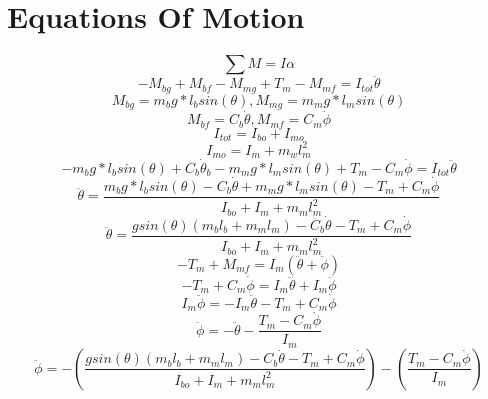 \documentclass[12pt]{article}
\begin{document}
	\section{Equations Of Motion}
		\begin{equation}
			\sum M = I\alpha
		\end{equation}
		\begin{equation}
			-M_{bg}+M_{bf}-M_{mg}+T_m-M_{mf} = I_{tot}\ddot\theta
		\end{equation}
		\begin{equation}
			M_{bg} = m_b g*l_b sin(\theta), M_{mg} = m_m g*l_msin(\theta)
		\end{equation}
		\begin{equation}
			M_{bf} = C_b \dot\theta, M_{mf} = C_m \dot\phi
		\end{equation}
		\begin{equation}
			I_{tot} = I_{bo} + I_{mo}
		\end{equation}
		\begin{equation}
			I_{mo} = I_m+m_wl_m^2
		\end{equation}
		\begin{equation}
			-m_b g*l_b sin(\theta) + C_b \dot{\theta}_b - m_m g*l_msin(\theta) + T_m - C_m \dot\phi = I_{tot}\ddot\theta
		\end{equation}
		\begin{equation}
			\ddot\theta = \frac{m_b g*l_b sin(\theta) - C_b \dot\theta + m_m g*l_msin(\theta) - T_m + C_m \dot\phi}{I_{bo}+I_m+m_ml_m^2}
		\end{equation}
		\begin{equation}
			\ddot\theta = \frac{gsin(\theta)(m_bl_b + m_ml_m) - C_b \dot\theta - T_m + C_m \dot\phi}{I_{bo}+I_m+m_ml_m^2}
		\end{equation}
		\begin{equation}
			-T_m+M_{mf} = I_m(\ddot\theta + \ddot\phi)
		\end{equation}
		\begin{equation}
			-T_m + C_m\dot\phi = I_m\ddot\theta + I_m\ddot\phi
		\end{equation}
		\begin{equation}
			I_m\ddot\phi = -I_m\ddot\theta-T_m+C_m\dot\phi
		\end{equation}
		\begin{equation}
			\ddot\phi = - \ddot\theta - \frac{T_m-C_m\dot\phi}{I_m}
		\end{equation}
		\begin{equation}
			\ddot\phi = -\left(\frac{gsin(\theta)(m_bl_b + m_ml_m) - C_b \dot\theta - T_m + C_m \dot\phi}{I_{bo}+I_m+m_ml_m^2}\right) - \left(\frac{T_m-C_m\dot\phi}{I_m}\right)
		\end{equation}
\end{document}
